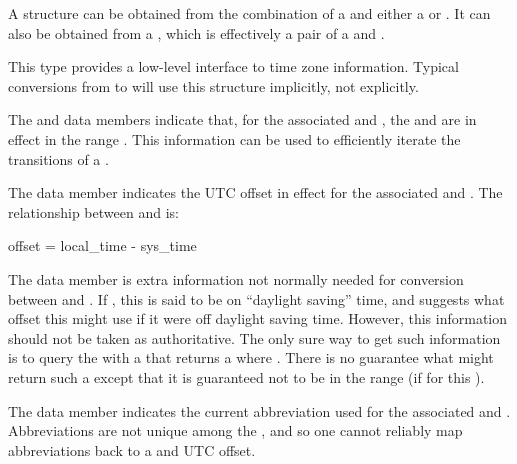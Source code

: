 \pnum
A  structure can be obtained
from the combination of a  and
either a  or .
It can also be obtained from a ,
which is effectively a pair of a  and .

\pnum
\begin{note}
This type provides a low-level interface to time zone information.
Typical conversions from  to 
will use this structure implicitly, not explicitly.
\end{note}

\pnum
{}%
%
The  and  data members indicate that,
for the associated  and ,
the  and  are in effect in the range .
This information can be used to efficiently iterate the transitions of a .

\pnum
{}%
The  data member indicates
the UTC offset in effect
for the associated  and .
The relationship between  and  is:

\begin{codeblock}
offset = local_time - sys_time
\end{codeblock}

\pnum
{}%
The  data member is extra information not normally needed
for conversion between  and .
If , this  is said to be on ``daylight saving'' time,
and  suggests what offset this  might use
if it were off daylight saving time.
However, this information should not be taken as authoritative.
The only sure way to get such information
is to query the  with a 
that returns a  where .
There is no guarantee what  might return such a 
except that it is guaranteed not to be in the range 
(if  for this ).

\pnum
{}%
The  data member indicates
the current abbreviation used for the associated  and .
Abbreviations are not unique among the ,
and so one cannot reliably map abbreviations back to a  and UTC offset.

